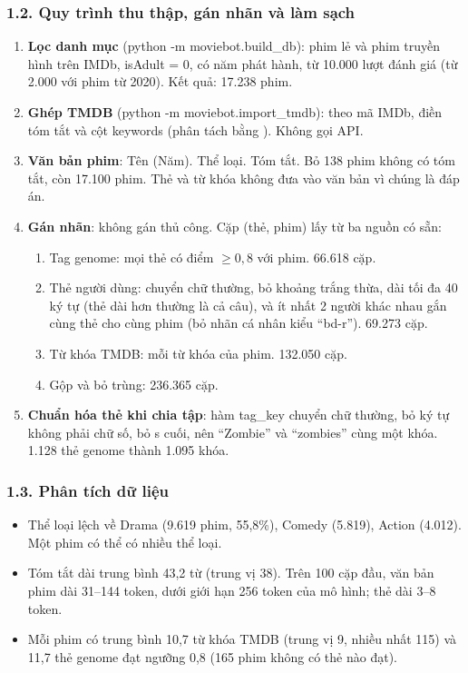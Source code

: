 \documentclass[12pt,a4paper]{article}
\providecommand{\tightlist}{\setlength{\itemsep}{0pt}\setlength{\parskip}{0pt}}
\let\oldsubsubsection\subsubsection
\renewcommand{\subsubsection}{\Needspace{10\baselineskip}\oldsubsubsection}
\begin{document}
\subsubsection{1.2. Quy trình thu thập, gán nhãn và làm sạch}

\begin{enumerate}
\def\labelenumi{\arabic{enumi}.}
\item \textbf{Lọc danh mục} (python -m moviebot.build\_db): phim lẻ và phim truyền hình trên IMDb, isAdult = 0, có năm phát hành, từ 10.000 lượt đánh giá (từ 2.000 với phim từ 2020). Kết quả: 17.238 phim.
\item \textbf{Ghép TMDB} (python -m moviebot.import\_tmdb): theo mã IMDb, điền tóm tắt và cột keywords (phân tách bằng \textbar). Không gọi API.
\item \textbf{Văn bản phim}: Tên (Năm). Thể loại. Tóm tắt. Bỏ 138 phim không có tóm tắt, còn 17.100 phim. Thẻ và từ khóa không đưa vào văn bản vì chúng là đáp án.
\item \textbf{Gán nhãn}: không gán thủ công. Cặp (thẻ, phim) lấy từ ba nguồn có sẵn:
  \begin{enumerate}
  \def\labelenumii{\alph{enumii}.}
  \item Tag genome: mọi thẻ có điểm $\geq 0{,}8$ với phim. 66.618 cặp.
  \item Thẻ người dùng: chuyển chữ thường, bỏ khoảng trắng thừa, dài tối đa 40 ký tự (thẻ dài hơn thường là cả câu), và ít nhất 2 người khác nhau gắn cùng thẻ cho cùng phim (bỏ nhãn cá nhân kiểu ``bd-r''). 69.273 cặp.
  \item Từ khóa TMDB: mỗi từ khóa của phim. 132.050 cặp.
  \item Gộp và bỏ trùng: 236.365 cặp.
  \end{enumerate}
\item \textbf{Chuẩn hóa thẻ khi chia tập}: hàm tag\_key chuyển chữ thường, bỏ ký tự không phải chữ số, bỏ s cuối, nên ``Zombie'' và ``zombies'' cùng một khóa. 1.128 thẻ genome thành 1.095 khóa.
\end{enumerate}

\subsubsection{1.3. Phân tích dữ liệu}

\begin{itemize}
\tightlist
\item Thể loại lệch về Drama (9.619 phim, 55,8\%), Comedy (5.819), Action (4.012). Một phim có thể có nhiều thể loại.
\item Tóm tắt dài trung bình 43,2 từ (trung vị 38). Trên 100 cặp đầu, văn bản phim dài 31--144 token, dưới giới hạn 256 token của mô hình; thẻ dài 3--8 token.
\item Mỗi phim có trung bình 10,7 từ khóa TMDB (trung vị 9, nhiều nhất 115) và 11,7 thẻ genome đạt ngưỡng 0,8 (165 phim không có thẻ nào đạt).
\end{itemize}
\end{document}
